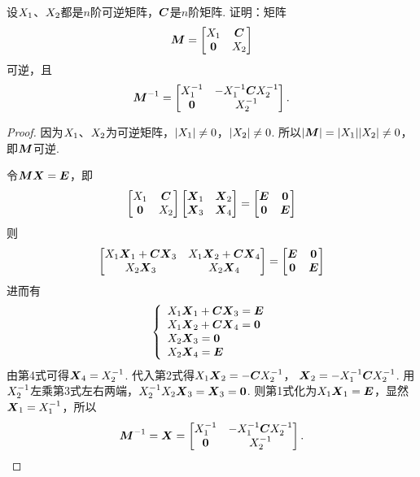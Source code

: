 \begin{example}\label{example:可逆矩阵.分块上三角矩阵的逆}
设\(\A\)、\(\B\)都是\(n\)阶可逆矩阵，\(\C\)是\(n\)阶矩阵.
证明：矩阵\[
	\vb{M} = \begin{bmatrix}
		\A & \C \\
		\z & \B
	\end{bmatrix}
\]可逆，且\[
	\vb{M}^{-1} = \begin{bmatrix}
		\A^{-1} & -\A^{-1} \C \B^{-1} \\
		\z & \B^{-1}
	\end{bmatrix}.
\]
\begin{proof}
因为\(\A\)、\(\B\)为可逆矩阵，\(\abs{\A} \neq 0\)，\(\abs{\B} \neq 0\).
所以\(\abs{\vb{M}}=\abs{\A}\abs{\B} \neq 0\)，即\(\vb{M}\)可逆.

令\(\vb{M}\x=\E\)，即\[
	\begin{bmatrix}
		\A & \C \\
		\z & \B
	\end{bmatrix}
	\begin{bmatrix}
		\x_1 & \x_2 \\
		\x_3 & \x_4
	\end{bmatrix}
	= \begin{bmatrix}
		\E & \z \\
		\z & \E
	\end{bmatrix}
\]则\[
	\begin{bmatrix}
		\A\x_1+\C\x_3 & \A\x_2+\C\x_4 \\
		\B\x_3 & \B\x_4
	\end{bmatrix}
	= \begin{bmatrix}
		\E & \z \\
		\z & \E
	\end{bmatrix}
\]
进而有\[
	\left\{ \begin{array}{l}
		\A\x_1+\C\x_3 = \E \\
		\A\x_2+\C\x_4 = \z \\
		\B\x_3 = \z \\
		\B\x_4 = \E
	\end{array} \right.
\]
由第4式可得\(\x_4 = \B^{-1}\).
代入第2式得\(\A\x_2=-\C\B^{-1}\)，
\(\x_2=-\A^{-1}\C\B^{-1}\).
用\(\B^{-1}\)左乘第3式左右两端，\(\B^{-1}\B\x_3=\x_3=\z\).
则第1式化为\(\A\x_1=\E\)，显然\(\x_1=\A^{-1}\)，所以\[
	\vb{M}^{-1} = \x = \begin{bmatrix}
		\A^{-1} & -\A^{-1}\C\B^{-1} \\
		\z & \B^{-1}
	\end{bmatrix}.
	\qedhere
\]
\end{proof}
\end{example}

